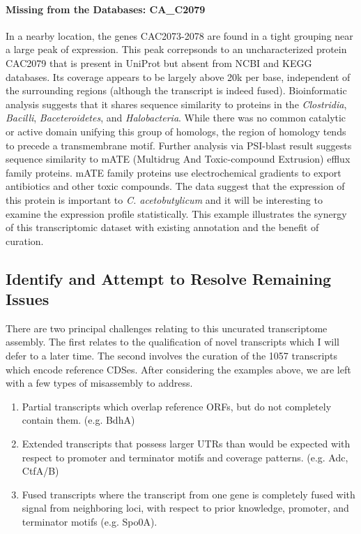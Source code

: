 \paragraph{Missing from the Databases: CA_C2079}

In a nearby location, the genes CAC2073-2078 are found in a tight grouping near a large peak of expression. This peak correpsonds to an uncharacterized protein CAC2079 that is present in UniProt but absent from NCBI and KEGG databases. Its coverage appears to be largely above 20k per base, independent of the surrounding regions (although the transcript is indeed fused). Bioinformatic analysis suggests that it shares sequence similarity to proteins in the \textit{Clostridia}, \textit{Bacilli}, \textit{Baceteroidetes}, and \textit{Halobacteria}. While there was no common catalytic or active domain unifying this group of homologs, the region of homology tends to precede a transmembrane motif. Further analysis via PSI-blast result suggests sequence similarity to mATE (Multidrug And Toxic-compound Extrusion) efflux family proteins. mATE family proteins use electrochemical gradients to export antibiotics and other toxic compounds. The data suggest that the expression of this protein is important to \textit{C. acetobutylicum} and it will be interesting to examine the expression profile statistically. This example illustrates the synergy of this transcriptomic dataset with existing annotation and the benefit of curation. 


\subsection{Identify and Attempt to Resolve Remaining Issues}
There are two principal challenges relating to this uncurated transcriptome assembly. The first relates to the qualification of novel transcripts which I will defer to a later time. The second involves the curation of the 1057 transcripts which encode reference CDSes. After considering the examples above, we are left with a few types of misassembly to address.
\begin{enumerate}
\item Partial transcripts which overlap reference ORFs, but do not completely contain them. (e.g. BdhA)
\item Extended transcripts that possess larger UTRs than would be expected with respect to promoter and terminator motifs and coverage patterns. (e.g. Adc, CtfA/B)
\item Fused transcripts where the transcript from one gene is completely fused with signal from neighboring loci, with respect to prior knowledge, promoter, and terminator motifs (e.g. Spo0A).
\end{enumerate}

